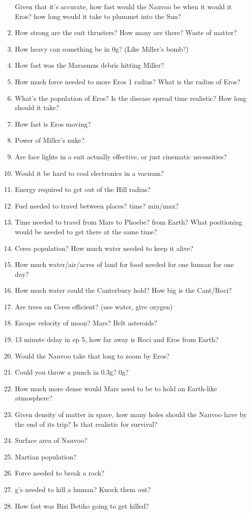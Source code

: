 \documentclass{amsart}
\theoremstyle{definition}
\begin{document}
\begin{enumerate}
    \subitem Given that it's accurate, how fast would the Nauvoo be when it would it Eros?
    \subitem how long would it take to plummet into the Sun?
    \item How strong are the suit thrusters? How many are there? Waste of matter?
    \item How heavy can something be in 0g? (Like Miller's bomb?)
    \item How fast was the Marasmus debris hitting Miller?
    \item How much force needed to more Eros 1 radius?
    \subitem What is the radius of Eros?
    \item What's the population of Eros?
    \subitem Is the disease spread time realistic? How long should it take?
    \item How fast is Eros moving?
    \item Power of Miller's nuke?
    \item Are face lights in a suit actually effective, or just cinematic necessities?
    \item Would it be hard to cool electronics in a vacuum?
    \item Energy required to get out of the Hill radius?
    \item Fuel needed to travel between places? time? min/max?
    \item Time needed to travel from Mars to Phoebe? from Earth? What positioning would be needed to get there at the same time?
    \item Ceres population? How much water needed to keep it alive?
    \item How much water/air/acres of land for food needed for one human for one day?
    \item How much water could the Canterbury hold? How big is the Cant/Roci?
    \item Are trees on Ceres efficient? (use water, give oxygen)
    \item Escape velocity of moon? Mars? Belt asteroids?
    \item 13 minute delay in ep 5, how far away is Roci and Eros from Earth?
    \item Would the Nauvoo take that long to zoom by Eros?
    \item Could you throw a punch in 0.3g? 0g?
    \item How much more dense would Mars need to be to hold an Earth-like atmosphere?
    \item Given density of matter in space, how many holes should the Nauvoo have by the end of its trip? Is that realistic for survival?
    \item Surface area of Nauvoo?
    \item Martian population?
    \item Force needed to break a rock?
    \item g's needed to kill a human? Knock them out?
    \item How fast was Bizi Betiko going to get killed?
    

\end{enumerate}
\end{document}
